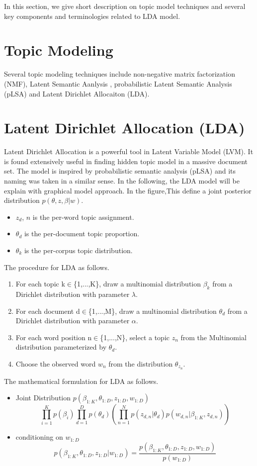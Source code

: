 In this section, we give short description on topic model techniques and several key components and terminologies related to LDA model.
\section{Topic Modeling} Several topic modeling techniques include non-negative matrix factorization (NMF), Latent Semantic Aanlysis \cite{landauer_solution_1997}, probabilistic Latent Semantic Analysis (pLSA) \cite{hofmann_probabilistic_2013} and Latent Dirichlet Allocaiton (LDA)\cite{blei_latent_2003}.
\section{Latent Dirichlet Allocation (LDA)} Latent Dirichlet Allocation\cite{blei_latent_2003} is a powerful tool in Latent Variable Model (LVM). It is found extensively useful in finding hidden topic model in a massive document set. The model is inspired by probabilistic semantic analysis (pLSA)\cite{hofmann_probabilistic_2013} and its naming was taken in a similar sense.
In the following, the LDA model will be explain with graphical model approach. In the figure,This define a joint posterior distribution $p(\theta,z,\beta|w)$. \begin{itemize}
\item $z_d$, $n$ is the per-word topic assignment.
\item $\theta_d$ is the per-document topic proportion.
\item $\theta_k$ is the per-corpus topic distribution.
\end{itemize}
The procedure for LDA as follows. \begin{enumerate}
\item For each topic k$\in$\{1,...,K\}, draw a multinomial distribution $\beta_k$ from a Dirichlet distribution with parameter $\lambda$.
\item For each document d$\in$\{1,...,M\}, draw a multinomial distribution $\theta_d$ from a Dirichlet distribution with parameter $\alpha$.
\item For each word position n$\in$\{1,...,N\}, select a topic $z_n$ from the Multinomial distribution parameterized by $\theta_d$.
\item Choose the observed word $w_n$ from the distribution $\theta_{z_n}$.
\end{enumerate}
The mathematical formulation for LDA as follows.
\begin{itemize}
\item Joint Distribution $p(\beta_{1:K},\theta_{1:D},z_{1:D},w_{1:D})$
\begin{equation*}
\prod_{i=1}^{K}p(\beta_i)\prod_{d=1}^{D}p(\theta_d)(\prod_{n=1}^{N}p(z_{d,n}|\theta_d)p(w_{d,n}|\beta_{1:K},z_{d,n}))
\end{equation*} 
\item conditioning on $w_{1:D}$
\begin{equation*}
p(\beta_{1:K},\theta_{1:D},z_{1:D}|w_{1:D})=\frac{p(\beta_{1:K},\theta_{1:D},z_{1:D},w_{1:D})}{p(w_{1:D})}
\end{equation*}
\end{itemize}
